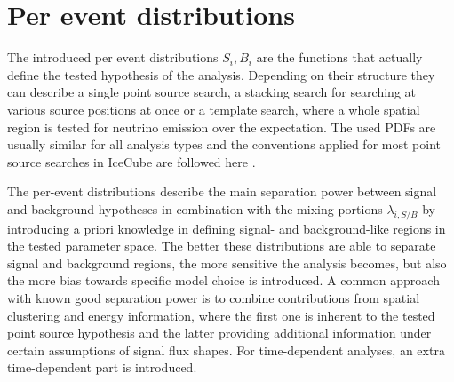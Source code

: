 \section{Per event distributions}
The introduced per event distributions $S_i, B_i$ are the functions that actually define the tested hypothesis of the analysis.
Depending on their structure they can describe a single point source search, a stacking search for searching at various source positions at once or a template search, where a whole spatial region is tested for neutrino emission over the expectation.
The used PDFs are usually similar for all analysis types and the conventions applied for most point source searches in IceCube are followed here \cite{Braun:2010APh,Braun:2008bg}.

The per-event distributions describe the main separation power between signal and background hypotheses in combination with the mixing portions $\lambda_{i,S/B}$ by introducing a priori knowledge in defining signal- and background-like regions in the tested parameter space.
The better these distributions are able to separate signal and background regions, the more sensitive the analysis becomes, but also the more bias towards specific model choice is introduced.
A common approach with known good separation power is to combine contributions from spatial clustering and energy information, where the first one is inherent to the tested point source hypothesis and the latter providing additional information under certain assumptions of signal flux shapes.
For time-dependent analyses, an extra time-dependent part is introduced.

